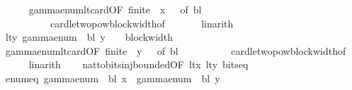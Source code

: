 \begin{isabellebody}
\ \ \ \ \isamarkupfalse%
\ gamma{\isacharunderscore}{\kern0pt}enum{\isacharunderscore}{\kern0pt}lt{\isacharunderscore}{\kern0pt}card{\isacharbrackleft}{\kern0pt}OF\ {\isacartoucheopen}finite\ {\isasymGamma}{\isacartoucheclose}\ {\isacartoucheopen}x\ {\isasymin}\ {\isasymGamma}{\isacartoucheclose}{\isacharcomma}{\kern0pt}\ of\ bl{\isacharbrackright}{\kern0pt}\isanewline
\ \ \ \ \ \ \ \ \ \ card{\isacharunderscore}{\kern0pt}le{\isacharunderscore}{\kern0pt}two{\isacharunderscore}{\kern0pt}pow{\isacharunderscore}{\kern0pt}block{\isacharunderscore}{\kern0pt}width{\isacharbrackleft}{\kern0pt}of\ {\isasymGamma}{\isacharbrackright}{\kern0pt}\isanewline
\ \ \ \ \isamarkupfalse%
\ linarith\isanewline
\ \ \isamarkupfalse%
\ lt{\isacharunderscore}{\kern0pt}y{\isacharcolon}{\kern0pt}\ {\isachardoublequoteopen}gamma{\isacharunderscore}{\kern0pt}enum\ {\isasymGamma}\ bl\ y\ {\isacharless}{\kern0pt}\ {}\ {\isacharcircum}{\kern0pt}\ block{\isacharunderscore}{\kern0pt}width\ {\isasymGamma}{\isachardoublequoteclose}\isanewline
\ \ \ \ \isamarkupfalse%
\ gamma{\isacharunderscore}{\kern0pt}enum{\isacharunderscore}{\kern0pt}lt{\isacharunderscore}{\kern0pt}card{\isacharbrackleft}{\kern0pt}OF\ {\isacartoucheopen}finite\ {\isasymGamma}{\isacartoucheclose}\ {\isacartoucheopen}y\ {\isasymin}\ {\isasymGamma}{\isacartoucheclose}{\isacharcomma}{\kern0pt}\ of\ bl{\isacharbrackright}{\kern0pt}\isanewline
\ \ \ \ \ \ \ \ \ \ card{\isacharunderscore}{\kern0pt}le{\isacharunderscore}{\kern0pt}two{\isacharunderscore}{\kern0pt}pow{\isacharunderscore}{\kern0pt}block{\isacharunderscore}{\kern0pt}width{\isacharbrackleft}{\kern0pt}of\ {\isasymGamma}{\isacharbrackright}{\kern0pt}\isanewline
\ \ \ \ \isamarkupfalse%
\ linarith\isanewline
\ \ \isamarkupfalse%
\ nat{\isacharunderscore}{\kern0pt}to{\isacharunderscore}{\kern0pt}bits{\isacharunderscore}{\kern0pt}inj{\isacharunderscore}{\kern0pt}bounded{\isacharbrackleft}{\kern0pt}OF\ lt{\isacharunderscore}{\kern0pt}x\ lt{\isacharunderscore}{\kern0pt}y\ bits{\isacharunderscore}{\kern0pt}eq{\isacharbrackright}{\kern0pt}\isanewline
\ \ \isamarkupfalse%
\ enum{\isacharunderscore}{\kern0pt}eq{\isacharcolon}{\kern0pt}\ {\isachardoublequoteopen}gamma{\isacharunderscore}{\kern0pt}enum\ {\isasymGamma}\ bl\ x\ {\isacharequal}{\kern0pt}\ gamma{\isacharunderscore}{\kern0pt}enum\ {\isasymGamma}\ bl\ y{\isachardoublequoteclose}\ \isakeywordONE{{\isachardot}{\kern0pt}}\isamarkupfalse%
\isanewline
\ \ \isamarkupfalse%

\end{isabellebody}
